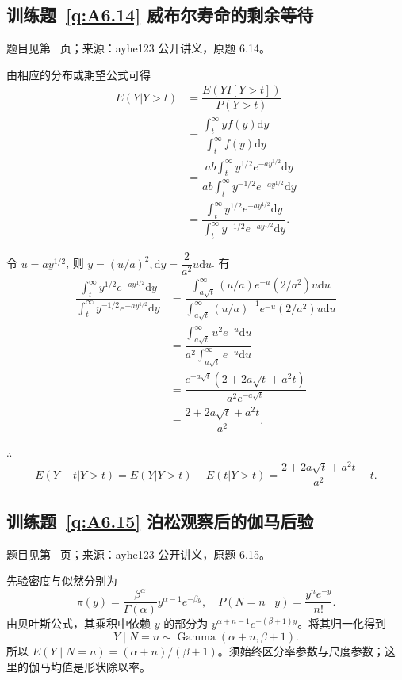 \documentclass[UTF8,12pt,a4paper,fontset=fandol]{ctexbook}
\begin{document}
\subsection*{训练题~\ref{q:A6.14} 威布尔寿命的剩余等待}\label{a:A6.14}{\small 题目见第~\pageref{q:A6.14} 页；来源：ayhe123 公开讲义，原题 6.14。}
\begin{solve}
    由相应的分布或期望公式可得
    \begin{align*}
        E(Y|Y>t) & =\dfrac{E(YI[Y>t])}{P(Y>t)} \\
        & =\dfrac{\int_t^\infty yf(y)\mathrm{d}y}{\int_t^\infty f(y)\mathrm{d}y} \\
        & =\dfrac{ab\int_t^\infty y^{1/2}e^{-ay^{1/2}}\mathrm{d}y}{ab\int_t^\infty y^{-1/2}e^{-ay^{1/2}}\mathrm{d}y} \\
        & =\dfrac{\int_t^\infty y^{1/2}e^{-ay^{1/2}}\mathrm{d}y}{\int_t^\infty y^{-1/2}e^{-ay^{1/2}}\mathrm{d}y}.
    \end{align*}

    令 $u=ay^{1/2}$, 则 $y=(u/a)^2,\mathrm{d}y=\dfrac{2}{a^2}u\mathrm{d}u$. 有
    \begin{align*}
        \dfrac{\int_t^\infty y^{1/2}e^{-ay^{1/2}}\mathrm{d}y}{\int_t^\infty y^{-1/2}e^{-ay^{1/2}}\mathrm{d}y} & =\dfrac{\int_{a\sqrt{t}}^\infty(u/a)e^{-u}(2/a^2)u\mathrm{d}u}{\int_{a\sqrt{t}}^\infty(u/a)^{-1}e^{-u}(2/a^2)u\mathrm{d}u} \\
        & =\dfrac{\int_{a\sqrt{t}}^\infty u^2e^{-u}\mathrm{d}u}{a^2\int_{a\sqrt{t}}^\infty e^{-u}\mathrm{d}u} \\
        & =\dfrac{e^{-a\sqrt{t}}(2+2a\sqrt{t}+a^2t)}{a^2e^{-a\sqrt{t}}} \\
        & =\dfrac{2+2a\sqrt{t}+a^2t}{a^2}.
    \end{align*}

    $\therefore$
    \[E(Y-t|Y>t)=E(Y|Y>t)-E(t|Y>t)=\dfrac{2+2a\sqrt{t}+a^2t}{a^2}-t.\]
\end{solve}

\subsection*{训练题~\ref{q:A6.15} 泊松观察后的伽马后验}\label{a:A6.15}{\small 题目见第~\pageref{q:A6.15} 页；来源：ayhe123 公开讲义，原题 6.15。}
\begin{solve}先验密度与似然分别为\[\pi(y)=\frac{\beta^\alpha}{\Gamma(\alpha)}y^{\alpha-1}e^{-\beta y},\quad P(N=n\mid y)=\frac{y^ne^{-y}}{n!}.\]由贝叶斯公式，其乘积中依赖 $y$ 的部分为 $y^{\alpha+n-1}e^{-(\beta+1)y}$。将其归一化得到\[Y\mid N=n\sim\operatorname{Gamma}(\alpha+n,\beta+1).\]所以 $E(Y\mid N=n)=(\alpha+n)/(\beta+1)$。须始终区分率参数与尺度参数；这里的伽马均值是形状除以率。\end{solve}
\end{document}
